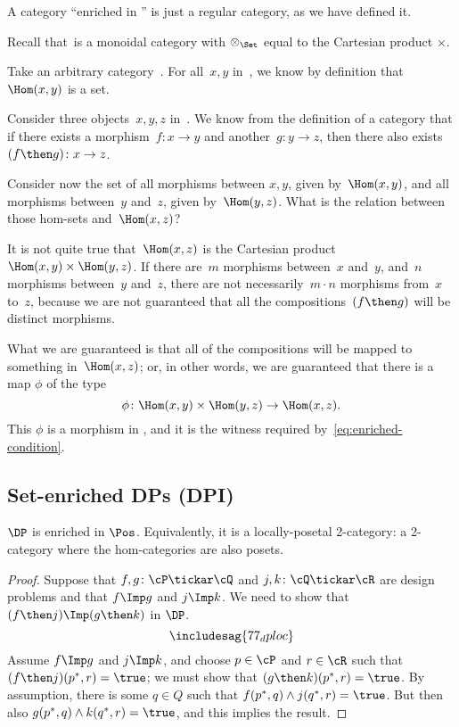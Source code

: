 
\begin{example}
A category ``enriched in \Set'' is just a regular category, as we have defined it.

Recall that~\Set is a monoidal category with $\otimes_{\Set}$ equal to the Cartesian product $\times$.

Take an arbitrary category~\CatC. For all~$x, y$ in~\CatC, we know by definition
that~$\Hom(x,y)$ is a set.

Consider three objects~$x,y,z$ in~\CatC. We know from the definition of a
category that if there exists a morphism~$f: x \to y$ and another~$g: y \to z$,
then there also exists~$(f\then g)\colon x \to z$.

Consider now the set of all morphisms between $x, y$, given by~$\Hom(x,y)$, and
all morphisms between~$y$ and~$z$, given by~$\Hom(y, z)$. What is the relation
between those hom-sets and~$\Hom(x, z)$?

It is not quite true that~$\Hom(x, z)$ is the Cartesian product~$\Hom(x, y)
\times \Hom(y, z)$. If there are~$m$ morphisms between~$x$ and~$y$, and~$n$
morphisms between~$y$ and~$z$, there are not necessarily~$m \cdot n$ morphisms
from~$x$ to~$z$, because we are not guaranteed that all the compositions~$(f\then g)$
will be distinct morphisms.

What we are guaranteed is that all of the compositions will be mapped to something in~$\Hom(x, z)$; or, in other words, we are guaranteed that there
is a map $\phi$ of the type
\begin{equation}
    \phi \colon \Hom(x, y) \times \Hom(y, z) \rightarrow \Hom(x, z).
\end{equation}
This $\phi$ is a morphism in \Set, and it is the witness required by~\eqref{eq:enriched-condition}.

\end{example}



\subsection{Set-enriched DPs (DPI)}

\begin{proposition}\label{prop:DP_loc_pos}
$\DP$ is enriched in $\Pos$. Equivalently, it is a locally-posetal 2-category: a 2-category where the hom-categories are also posets.
\end{proposition}
\begin{proof}
Suppose that $f,g\colon\cP \tickar\cQ $ and $j,k\colon\cQ \tickar\cR $ are design problems and that $f\Imp g$ and $j\Imp k$. We need to show that $(f\then j)\Imp(g\then k)$ in $\DP$.
\begin{equation}
\includesag{77_dploc}
\end{equation}
Assume $f\Imp g$ and $j\Imp k$, and choose $p\in\cP $ and $r\in\cR $ such that $(f\then j)(p^*,r)=\true$; we must show that $(g\then k)(p^*,r)=\true$. By assumption, there is some $q\in Q$ such that $f(p^*,q)\wedge j(q^*,r)=\true$. But then also $g(p^*,q)\wedge k(q^*,r)=\true$, and this implies the result.
\end{proof}

